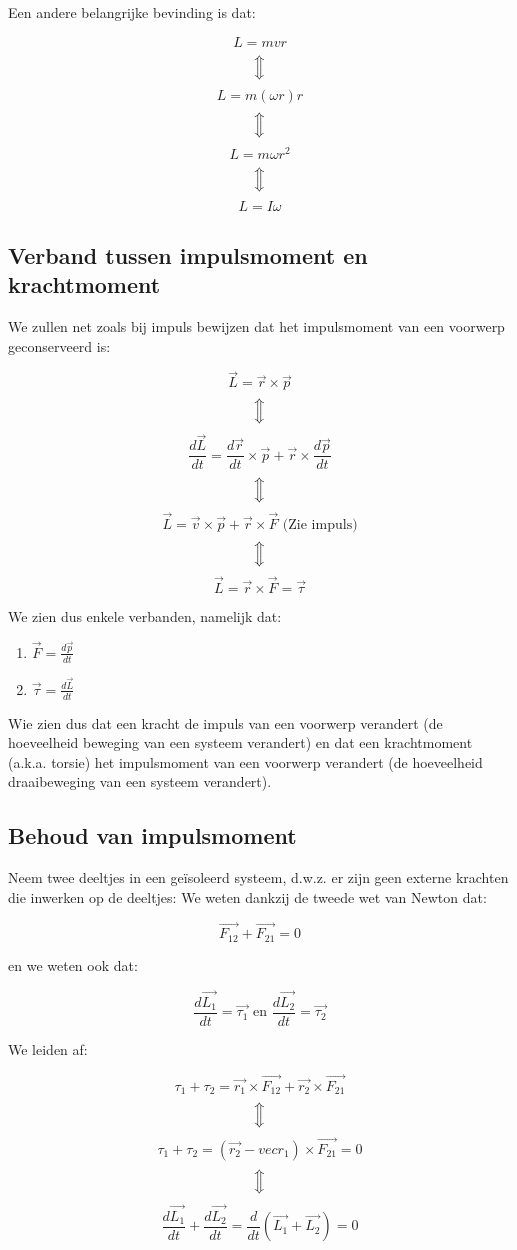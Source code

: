 \documentclass[12pt,a4paper]{article}
\newcommand{\Luda}{\Big\Updownarrow}
\begin{document}
   Een andere belangrijke bevinding is dat:
   
   $$L = mvr$$
   $$\Luda$$
   $$L = m(\omega r)r$$
   $$\Luda$$
   $$L = m\omega r^{2}$$
   $$\Luda$$
   $$L = I\omega$$
   
   \subsection{Verband tussen impulsmoment en krachtmoment}
   We zullen net zoals bij impuls bewijzen dat het impulsmoment van een voorwerp geconserveerd is:
   
   $$\vec{L} = \vec{r} \times \vec{p}$$
   $$\Luda$$
   $$\frac{d\vec{L}}{dt} = \frac{d\vec{r}}{dt} \times \vec{p} + \vec{r} \times \frac{d\vec{p}}{dt}$$
   $$\Luda$$
   $$\vec{L} = \vec{v} \times \vec{p} + \vec{r} \times \vec{F} \textrm{ (Zie impuls)}$$
   $$\Luda$$
   $$\vec{L} = \vec{r} \times \vec{F} = \vec{\tau} $$
   
   We zien dus enkele verbanden, namelijk dat:
   
   \begin{enumerate}
   	\item $\vec{F} = \frac{d\vec{p}}{dt}$
   	\item $\vec{\tau} = \frac{d\vec{L}}{dt}$
   \end{enumerate}

    Wie zien dus dat een kracht de impuls van een voorwerp verandert (de hoeveelheid beweging van een systeem verandert) en dat
    een krachtmoment (a.k.a. torsie) het impulsmoment van een voorwerp verandert (de hoeveelheid draaibeweging van een systeem verandert).
    
    \subsection{Behoud van impulsmoment}
    Neem twee deeltjes in een geïsoleerd systeem, d.w.z. er zijn geen externe krachten die inwerken op de deeltjes:
    We weten dankzij de tweede wet van Newton dat:
    
    $$\vec{F_{12}} + \vec{F_{21}} = 0$$
    
    en we weten ook dat:
    
    $$\frac{d\vec{L_{1}}}{dt} = \vec{\tau_{1}} \textrm{ en } \frac{d\vec{L_{2}}}{dt} = \vec{\tau_{2}}$$

    We leiden af:
    
    $$\tau_1 + \tau_2 = \vec{r_{1}} \times \vec{F_{12}} + \vec{r_{2}} \times \vec{F_{21}}$$
    $$\Luda$$
    $$\tau_1 + \tau_2 = (\vec{r_{2}} - vec{r_{1}}) \times \vec{F_{21}} = 0$$
    $$\Luda$$
    $$\frac{d\vec{L_{1}}}{dt} + \frac{d\vec{L_{2}}}{dt} = \frac{d}{dt}(\vec{L_1} + \vec{L_2}) = 0$$
    
\end{document}

